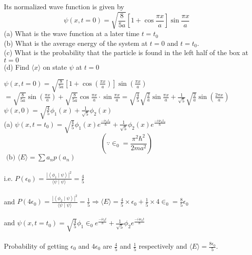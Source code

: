 \begin{enumerate}
\begin{minipage}{\textwidth}
$$	$$
	Its normalized wave function is given by
	$$
	\psi(x, t=0)=\sqrt{\frac{8}{5 a}}\left[1+\cos \frac{\pi x}{a}\right] \sin \frac{\pi x}{a}
	$$
	(a) What is the wave function at a later time $t=t_{0}$\\
	(b) What is the average energy of the system at $t=0$ and $t=t_{0}$.\\
	(c) What is the probability that the particle is found in the left half of the box at $t=0$\\
	(d) Find $\langle x\rangle$ on state $\psi$ at $t=0$
\end{minipage}
\begin{answer}
$\psi(x, t=0)=\sqrt{\frac{8}{5 a}}\left[1+\cos \left(\frac{\pi x}{a}\right)\right] \sin \left(\frac{\pi x}{a}\right)$\\
$=\sqrt{\frac{8}{5 a}} \sin \left(\frac{\pi x}{a}\right)+\sqrt{\frac{8}{5 a}} \cos \frac{\pi x}{a} \cdot \sin \frac{\pi x}{a}=\sqrt{\frac{4}{5}} \sqrt{\frac{2}{a}} \sin \frac{\pi x}{a}+\frac{1}{\sqrt{5}} \sqrt{\frac{2}{a}} \sin \left(\frac{2 \pi x}{a}\right)$\\
$\psi(x, 0)=\sqrt{\frac{4}{5}} \phi_{1}(x)+\frac{1}{\sqrt{5}} \phi_{2}(x)$\\
(a) $\psi\left(x, t=t_{0}\right)=\sqrt{\frac{4}{5}} \phi_{1}(x) e^{\frac{-i \epsilon_{0} t_{0}}{\hbar}}+\frac{1}{\sqrt{5}} \phi_{2}(x) e^{\frac{-i 4 \epsilon_{0} t_{0}}{\hbar}}$
$$
\left(\because \in_{0}=\frac{\pi^{2} \hbar^{2}}{2 m a^{2}}\right)
$$
$\text { (b) }\langle E\rangle=\sum a_{n} p\left(a_{n}\right)$\\\\
i.e. $P\left(\epsilon_{0}\right)=\frac{\left|\left\langle\phi_{1} \mid \psi\right\rangle\right|^{2}}{\langle\psi \mid \psi\rangle}=\frac{4}{5}$\\\\
 and $P\left(4 \epsilon_{0}\right)=\frac{\left|\left\langle\phi_{2} \mid \psi\right\rangle\right|^{2}}{\langle\psi \mid \psi\rangle}=\frac{1}{5} \Rightarrow\langle E\rangle=\frac{4}{5} \times \epsilon_{0}+\frac{1}{5} \times 4 \in_{0}=\frac{8}{5} \epsilon_{0}$\\\\
 and $\psi\left(x, t=t_{0}\right)=\sqrt{\frac{4}{5}} \phi_{1} \in_{0} e^{\frac{-i \epsilon_{0} t}{\hbar}}+\frac{1}{\sqrt{5}} \phi_{2} e^{\frac{-i 4 \epsilon_{0} t}{\hbar}}$\\\\
Probability of getting $\epsilon_{0}$ and $4 \epsilon_{0}$ are $\frac{4}{5}$ and $\frac{1}{5}$ respectively and $\langle E\rangle=\frac{8 \epsilon_{0}}{5}$.\\

\end{answer}
\end{enumerate}
